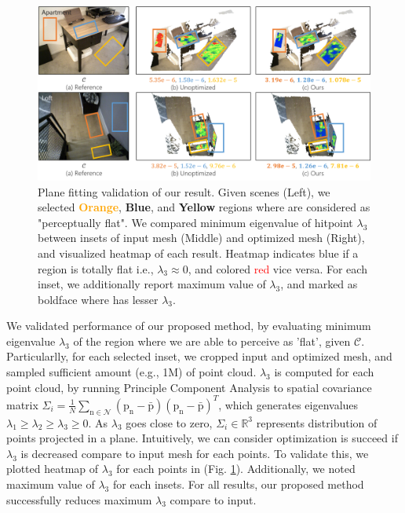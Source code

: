 \begin{figure}
    \includegraphics[width=\textwidth]{figures/4_result_plane_fitting_all.png}
    \caption{Plane fitting validation of our result. Given scenes (Left), we selected \textcolor{Orange}{\textbf{Orange}}, \textcolor{NavyBlue}{\textbf{Blue}}, and \textcolor{Dandelion}{\textbf{Yellow}} regions where are considered as "perceptually flat". We compared minimum eigenvalue of hitpoint $\lambda_3$ between insets of input mesh (Middle) and optimized mesh (Right), and visualized heatmap of each result. Heatmap indicates \textcolor{NavyBlue}{blue} if a region is totally flat i.e., $\lambda_3 \approx 0$, and colored \textcolor{Red}{red} vice versa. For each inset, we additionally report maximum value of $\lambda_3$, and marked as boldface where has lesser $\lambda_3$. }
    \label{fig:result_plane_fitting}
\end{figure}

We validated performance of our proposed method, by evaluating minimum eigenvalue $\lambda_3$ of the region where we are able to perceive as 'flat', given $\mathcal{C}$.
Particularlly, for each selected inset, we cropped input and optimized mesh, and sampled sufficient amount (e.g., 1M) of point cloud. 
$\lambda_3$ is computed for each point cloud, by running Principle Component Analysis to spatial covariance matrix $\Sigma_i=\frac{1}{N}\sum_{\mathrm{n}\in\mathcal{N}}(\mathrm{p_n}-\bar{\mathrm{p}})(\mathrm{p_n}-\bar{\mathrm{p}})^T$, which generates eigenvalues $\lambda_1 \ge \lambda_2 \ge \lambda_3 \ge 0$. 
As $\lambda_3$ goes close to zero, $\Sigma_i \in \mathbb{R}^3$ represents distribution of points projected in a plane.
Intuitively, we can consider optimization is succeed if $\lambda_3$ is decreased compare to input mesh for each points.
To validate this, we plotted heatmap of $\lambda_3$ for each points in (Fig. \ref{fig:result_plane_fitting}).
Additionally, we noted maximum value of $\lambda_3$ for each insets.
For all results, our proposed method successfully reduces maximum $\lambda_3$ compare to input.

